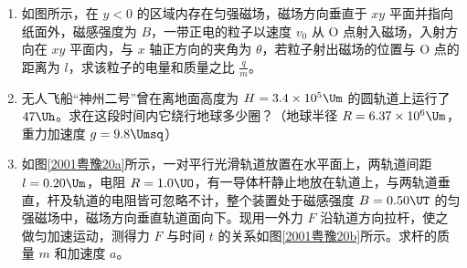 \documentclass[\gkver]{gaokaozhenti}
\begin{document}
\begin{enumerate}
{评分标准：本题 12 分。①式 8 分，②式 4 分。
}

\item
如图所示，在 $y < 0$ 的区域内存在匀强磁场，磁场方向垂直于 $xy$ 平面并指向纸面外，磁感强度为 $B$，一带正电的粒子以速度 $v_{0}$ 从 O 点射入磁场，入射方向在 $xy$ 平面内，与 $x$ 轴正方向的夹角为 $\theta$，若粒子射出磁场的位置与 O 点的距离为 $l$，求该粒子的电量和质量之比 $\frac{q}{m}$。

\item
无人飞船“神州二号”曾在离地面高度为 $H=3.4\times10^{5}\Um$ 的圆轨道上运行了 $47\Uh$。求在这段时间内它绕行地球多少圈？（地球半径 $R=6.37\times10^{6}\Um$，重力加速度 $g=9.8\Umsq$）

\item
如图\ref{2001粤豫20a}所示，一对平行光滑轨道放置在水平面上，两轨道间距 $l = 0.20\Um$，电阻 $R = 1.0\UO$，有一导体杆静止地放在轨道上，与两轨道垂直，杆及轨道的电阻皆可忽略不计，整个装置处于磁感强度 $B = 0.50\UT$ 的匀强磁场中，磁场方向垂直轨道面向下。现用一外力 $F$ 沿轨道方向拉杆，使之做匀加速运动，测得力 $F$ 与时间 $t$ 的关系如图\ref{2001粤豫20b}所示。求杆的质量 $m$ 和加速度 $a$。
\twopicture[numstyle=arabic, align=right, labelA=2001粤豫20a, labelB=2001粤豫20b, hA=3.72cm, wB=8.86cm]
{}
{}
\end{enumerate}
\end{document}
